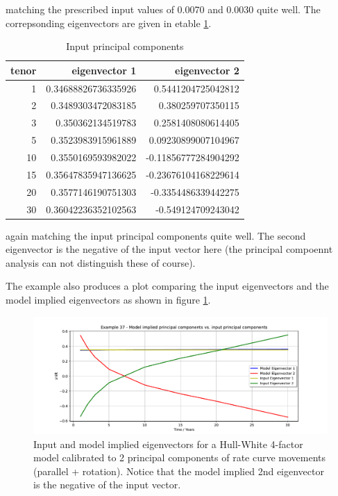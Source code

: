\documentclass[12pt, a4paper]{article}
\begin{document}
matching the prescribed input values of 0.0070 and 0.0030 quite well. The correpsonding eigenvectors are given in etable
\ref{tab:ex37_4}.

\begin{table}[hbt]
\begin{center}
\begin{tabular}{r|r|r}
tenor & eigenvector 1       & eigenvector 2       \\
\hline      
1     & 0.34688826736335926 & 0.5441204725042812  \\
2     & 0.3489303472083185  & 0.380259707350115   \\
3     & 0.350362134519783   & 0.2581408080614405  \\
5     & 0.3523983915961889  & 0.09230899007104967 \\
10    & 0.3550169593982022  & -0.11856777284904292\\
15    & 0.35647835947136625 & -0.23676104168229614\\
20    & 0.3577146190751303  & -0.3354486339442275 \\
30    & 0.36042236352102563 & -0.549124709243042  \\
\end{tabular}
\caption{Input principal components}
\label{tab:ex37_4}
\end{center}
\end{table}

again matching the input principal components quite well. The second eigenvector is the negative of the input vector
here (the principal compoennt analysis can not distinguish these of course).

The example also produces a plot comparing the input eigenvectors and the model implied eigenvectors as shown in figure \ref{fig:ex37}.

\begin{figure}[h!]
\begin{center}
\includegraphics[scale=0.50]{mpl_eigenvectors_ex37.pdf}
\end{center}
\caption{Input and model implied eigenvectors for a Hull-White 4-factor model calibrated to 2 principal components of
  rate curve movements (parallel + rotation). Notice that the model implied 2nd eigenvector is the negative of the input
  vector.}
\label{fig:ex37}
\end{figure}
\end{document}
